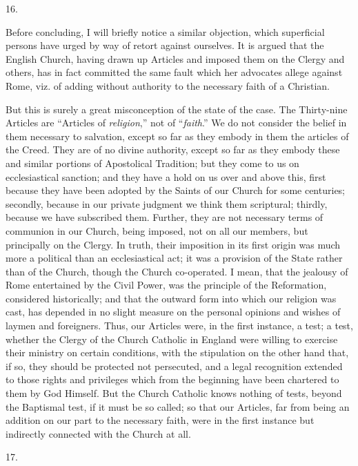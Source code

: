 16.

Before concluding, I will briefly notice a similar objection, which
superficial persons have urged by way of retort against ourselves. It
is argued that the English Church, having drawn up Articles and
imposed them on the Clergy and others, has in fact committed the same
fault which her advocates allege against Rome, viz. of adding without
authority to the necessary faith of a Christian.

But this is surely a great misconception of the state of the case.
The Thirty-nine Articles are ``Articles of \emph{religion},''
not of ``\emph{faith}.'' We do not consider the belief in them
necessary to salvation, except so far as they embody in them the
articles of the Creed. They are of no divine authority, except so far
as they embody these and similar portions of Apostolical Tradition;
but they come to us on ecclesiastical sanction; and they have a hold
on us over and above this, first because they have been adopted by the
Saints of our Church for some centuries; secondly, because in our
private judgment we think them scriptural; thirdly, because we have
subscribed them. Further, they are not necessary terms of communion in
our Church, being imposed, not on all our members, but principally on
the Clergy. In truth, their imposition in its first origin was much
more a political than an ecclesiastical act; it was a provision of the
State rather than of the Church, though the Church co-operated. I
mean, that the jealousy of Rome entertained by the Civil Power, was
the principle of the Reformation, considered historically; and that
the outward form into which our religion was cast, has depended in no
slight measure on the personal opinions and wishes of laymen and
foreigners. Thus, our Articles were, in the first instance, a test; a
test, whether the Clergy of the Church Catholic in England were
willing to exercise their ministry on certain conditions, with the
stipulation on the other hand that, if so, they should be
protected not persecuted, and a legal recognition extended to those
rights and privileges which from the beginning have been chartered to
them by God Himself. But the Church Catholic knows nothing of tests,
beyond the Baptismal test, if it must be so called; so that our
Articles, far from being an addition on our part to the necessary
faith, were in the first instance but indirectly connected with the
Church at all.

17.

